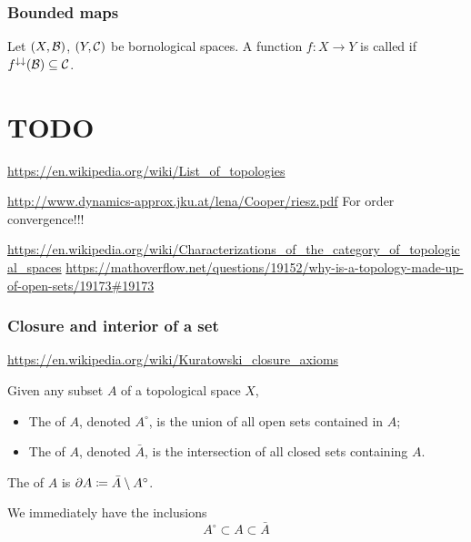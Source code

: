 \subsection{Bounded maps}
\begin{definition}
Let $\sSet{X, \mathcal{B}}$, $\sSet{Y,\mathcal{C}}$ be bornological spaces. A function $f: X\to Y$ is called  if $f^{\downarrow\downarrow}(\mathcal{B}) \subseteq \mathcal{C}$.
\end{definition}






\chapter{TODO}

\url{https://en.wikipedia.org/wiki/List_of_topologies}

\url{http://www.dynamics-approx.jku.at/lena/Cooper/riesz.pdf} For order convergence!!!


\url{https://en.wikipedia.org/wiki/Characterizations_of_the_category_of_topological_spaces} 
\url{https://mathoverflow.net/questions/19152/why-is-a-topology-made-up-of-open-sets/19173#19173}




\subsection{Closure and interior of a set}
\url{https://en.wikipedia.org/wiki/Kuratowski_closure_axioms}

\begin{definition}
Given any subset $A$ of a topological space $X$,
\begin{itemize}
\item The  of $A$, denoted $A^\circ$, is the union of all open sets contained in $A$;
\item The  of $A$, denoted $\bar{A}$, is the intersection of all closed sets containing $A$. 
\end{itemize}
The  of $A$ is $\partial A \coloneqq \bar{A}\setminus A^{\circ}$.
\end{definition}
We immediately have the inclusions
\[ A^\circ \subset A \subset \bar{A} \]

